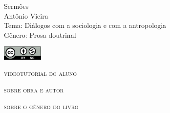 \documentclass[smaller,professionalfonts,15pt]{beamer}
\begin{document}
										\begin{frame}\begin{raggedleft}
										\Huge 
Sermões						\\
										\huge 
Antônio Vieira							\\
										\bigskip
										\normalsize
Tema: Diálogos com a sociologia e com a antropologia		\\	
Gênero: Prosa doutrinal 			\\\vfill\hfill
\publishername
										\end{raggedleft}

\smallskip\includegraphics[width=2cm]{ccbync.png}\hfill
\end{frame}


\begin{frame}{\textsc{videotutorial do aluno}}
\vspace{-2cm}\begin{figure}
\end{figure}
\end{frame}


\begin{frame}
\hfill\Huge
\textsc{sobre obra e autor}
\end{frame}

\begin{frame}
\hfill\Huge
\textsc{sobre o gênero do livro}
\end{frame}
\end{document}
